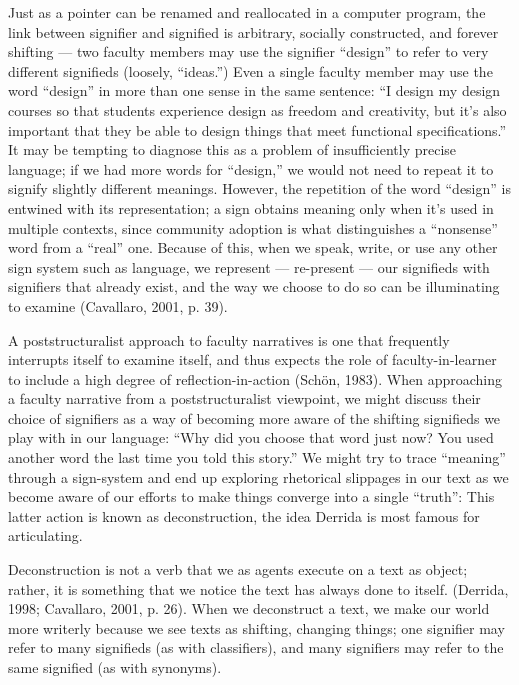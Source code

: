 Just as a pointer can be renamed and reallocated in a computer program, the link between signifier and signified is arbitrary, socially constructed, and forever shifting — two faculty members may use the signifier “design” to refer to very different signifieds (loosely, “ideas.”) Even a single faculty member may use the word “design” in more than one sense in the same sentence: “I design my design courses so that students experience design as freedom and creativity, but it’s also important that they be able to design things that meet functional specifications.” It may be tempting to diagnose this as a problem of insufficiently precise language; if we had more words for “design,” we would not need to repeat it to signify slightly different meanings. However, the repetition of the word “design” is entwined with its representation; a sign obtains meaning only when it’s used in multiple contexts, since community adoption is what distinguishes a “nonsense” word from a “real” one. Because of this, when we speak, write, or use any other sign system such as language, we represent — re-present — our signifieds with signifiers that already exist, and the way we choose to do so can be illuminating to examine (Cavallaro, 2001, p. 39).

A poststructuralist approach to faculty narratives is one that frequently interrupts itself to examine itself, and thus expects the role of faculty-in-learner to include a high degree of reflection-in-action (Schön, 1983). When approaching a faculty narrative from a poststructuralist viewpoint, we might discuss their choice of signifiers as a way of becoming more aware of the shifting signifieds we play with in our language: “Why did you choose that word just now? You used another word the last time you told this story.” We might try to trace “meaning” through a sign-system and end up exploring rhetorical slippages in our text as we become aware of our efforts to make things converge into a single “truth”: This latter action is known as deconstruction, the idea Derrida is most famous for articulating.

Deconstruction is not a verb that we as agents execute on a text as object; rather, it is something that we notice the text has always done to itself. (Derrida, 1998; Cavallaro, 2001, p. 26). When we deconstruct a text, we make our world more writerly because we see texts as shifting, changing things; one signifier may refer to many signifieds (as with classifiers), and many signifiers may refer to the same signified (as with synonyms). 

